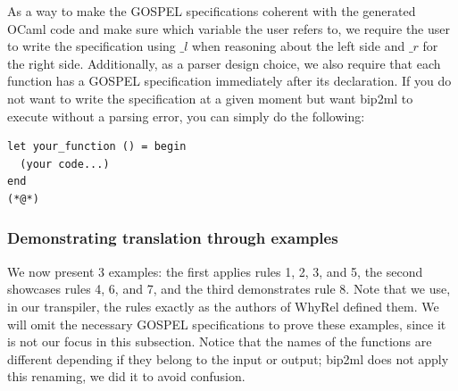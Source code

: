 As a way to make the GOSPEL specifications coherent with the generated OCaml code and make sure which variable the user refers to, we require the user to write the specification using $\_l$ when reasoning about the left side and $\_r$ for the right side.
Additionally, as a parser design choice, we also require that each function has a GOSPEL specification immediately after its declaration.
If you do not want to write the specification at a given moment but want bip2ml to execute without a parsing error, you can simply do the following:
\begin{lstlisting}[mathescape, basicstyle=\ttfamily, columns=flexible,
                    emph={type, and, let, rec, if, then, else, mod, in, for, while, do, done, to, begin, end, assert, match, with, of, open, include,ref},
                    emphstyle=\ttfamily\bfseries\color{myorange}]
let your_function () = begin
  (your code...)
end
(*@*)
\end{lstlisting}


\subsubsection{Demonstrating translation through examples}
\label{subsubsec:translator_printer_examples}

We now present 3 examples: the first applies rules 1, 2, 3, and 5, the second showcases rules 4, 6, and 7, and the third demonstrates rule 8.
Note that we use, in our transpiler, the rules exactly as the authors of WhyRel defined them. 
We will omit the necessary GOSPEL specifications to prove these examples, since it is not our focus in this subsection.
Notice that the names of the functions are different depending if they belong to the input or output; bip2ml does not apply this renaming, we did it to avoid confusion.

